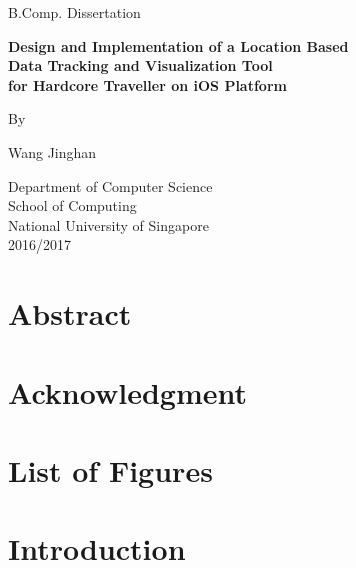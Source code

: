 \documentclass[12pt,a4paper]{article}
\begin{document}
	\begin{titlepage}
		\begin{center}
		
			B.Comp. Dissertation
			
			\vspace*{2.5cm}
			
			\fontsize{14pt}{14pt}\textbf {
			    Design and Implementation of a Location Based\\
                Data Tracking and Visualization Tool\\
                for Hardcore Traveller on iOS Platform\\
			}
			
			\vspace{2.5cm}
			
			By
			
			\vspace{0.5cm}
			
			Wang Jinghan
			
			\vfill
			
			Department of Computer Science\\
			School of Computing\\
			National University of Singapore\\
			2016/2017
			
		\end{center}
	\end{titlepage}
	
	
    \section*{Abstract}
    \clearpage
    
    
    \section*{Acknowledgment}
    \clearpage
    
    
    \section*{List of Figures}
    \clearpage
	
	
	\tableofcontents


	\newpage


	\section{Introduction} %
\end{document}
